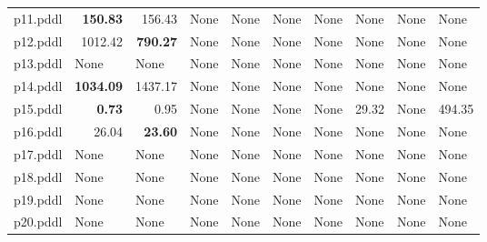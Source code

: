 \documentclass{article}
\begin{document}
\begin{tabular}{@{}lrrrrrrrrr@{}}
p11.pddl & \textbf{150.83} & 156.43 & \multicolumn{1}{|l|}{None} & \multicolumn{1}{|l|}{None} & \multicolumn{1}{|l|}{None} & \multicolumn{1}{|l|}{None} & \multicolumn{1}{|l|}{None} & \multicolumn{1}{|l|}{None} & \multicolumn{1}{|l|}{None} \\
p12.pddl & 1012.42 & \textbf{790.27} & \multicolumn{1}{|l|}{None} & \multicolumn{1}{|l|}{None} & \multicolumn{1}{|l|}{None} & \multicolumn{1}{|l|}{None} & \multicolumn{1}{|l|}{None} & \multicolumn{1}{|l|}{None} & \multicolumn{1}{|l|}{None} \\
p13.pddl & \multicolumn{1}{|l|}{None} & \multicolumn{1}{|l|}{None} & \multicolumn{1}{|l|}{None} & \multicolumn{1}{|l|}{None} & \multicolumn{1}{|l|}{None} & \multicolumn{1}{|l|}{None} & \multicolumn{1}{|l|}{None} & \multicolumn{1}{|l|}{None} & \multicolumn{1}{|l|}{None} \\
p14.pddl & \textbf{1034.09} & 1437.17 & \multicolumn{1}{|l|}{None} & \multicolumn{1}{|l|}{None} & \multicolumn{1}{|l|}{None} & \multicolumn{1}{|l|}{None} & \multicolumn{1}{|l|}{None} & \multicolumn{1}{|l|}{None} & \multicolumn{1}{|l|}{None} \\
p15.pddl & \textbf{0.73} & 0.95 & \multicolumn{1}{|l|}{None} & \multicolumn{1}{|l|}{None} & \multicolumn{1}{|l|}{None} & \multicolumn{1}{|l|}{None} & 29.32 & \multicolumn{1}{|l|}{None} & 494.35 \\
p16.pddl & 26.04 & \textbf{23.60} & \multicolumn{1}{|l|}{None} & \multicolumn{1}{|l|}{None} & \multicolumn{1}{|l|}{None} & \multicolumn{1}{|l|}{None} & \multicolumn{1}{|l|}{None} & \multicolumn{1}{|l|}{None} & \multicolumn{1}{|l|}{None} \\
p17.pddl & \multicolumn{1}{|l|}{None} & \multicolumn{1}{|l|}{None} & \multicolumn{1}{|l|}{None} & \multicolumn{1}{|l|}{None} & \multicolumn{1}{|l|}{None} & \multicolumn{1}{|l|}{None} & \multicolumn{1}{|l|}{None} & \multicolumn{1}{|l|}{None} & \multicolumn{1}{|l|}{None} \\
p18.pddl & \multicolumn{1}{|l|}{None} & \multicolumn{1}{|l|}{None} & \multicolumn{1}{|l|}{None} & \multicolumn{1}{|l|}{None} & \multicolumn{1}{|l|}{None} & \multicolumn{1}{|l|}{None} & \multicolumn{1}{|l|}{None} & \multicolumn{1}{|l|}{None} & \multicolumn{1}{|l|}{None} \\
p19.pddl & \multicolumn{1}{|l|}{None} & \multicolumn{1}{|l|}{None} & \multicolumn{1}{|l|}{None} & \multicolumn{1}{|l|}{None} & \multicolumn{1}{|l|}{None} & \multicolumn{1}{|l|}{None} & \multicolumn{1}{|l|}{None} & \multicolumn{1}{|l|}{None} & \multicolumn{1}{|l|}{None} \\
p20.pddl & \multicolumn{1}{|l|}{None} & \multicolumn{1}{|l|}{None} & \multicolumn{1}{|l|}{None} & \multicolumn{1}{|l|}{None} & \multicolumn{1}{|l|}{None} & \multicolumn{1}{|l|}{None} & \multicolumn{1}{|l|}{None} & \multicolumn{1}{|l|}{None} & \multicolumn{1}{|l|}{None} \\
\end{tabular}
\end{document}
